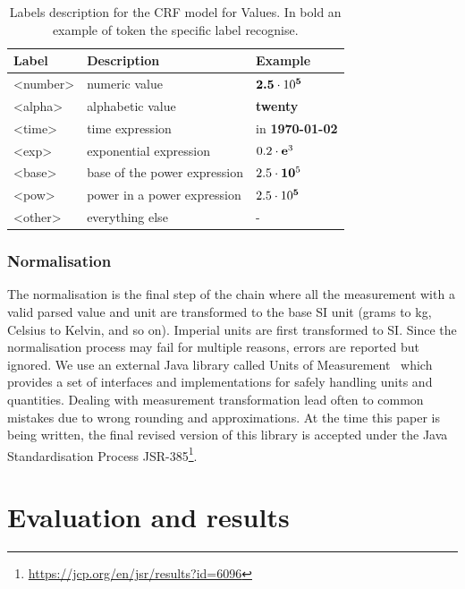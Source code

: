 \documentclass[sigconf]{acmart}
\begin{document}
\begin{table}[ht]
  \caption{Labels description for the CRF model for Values. In bold an example of token the specific label recognise.}
  \label{tab:values-model-labels}
  \begin{tabular}{lll}
    \toprule
    Label & Description & Example\\
    \midrule
    <number> & numeric value & $\textbf{2.5}\cdot10\textsuperscript{\textbf{5}}$ \\
    <alpha> & alphabetic value & \textbf{twenty} \\
    <time> & time expression  & in \textbf{1970-01-02}\\
    <exp> & exponential expression & $0.2\cdot\textbf{e}\textsuperscript{3}$ \\
    <base> & base of the power expression & $2.5\cdot\textbf{10}\textsuperscript{5}$\\
    <pow> & power in a power expression & $2.5\cdot10\textsuperscript{\textbf{5}}$ \\
    <other> & everything else & - \\
  \bottomrule
\end{tabular}
\end{table}

\subsubsection{Normalisation}

The normalisation is the final step of the chain where all the measurement with a valid parsed value and unit are transformed to the base SI unit (grams to kg, Celsius to Kelvin, and so on). Imperial units are first transformed to SI. Since the normalisation process may fail for multiple reasons, errors are reported but ignored. We use an external Java library called Units of Measurement~\cite{units_of_measurement} which provides a set of interfaces and implementations for safely handling units and quantities. Dealing with measurement transformation lead often to common mistakes due to wrong rounding and approximations. At the time this paper is being written, the final revised version of this library is accepted under the Java Standardisation Process JSR-385\footnote{\url{https://jcp.org/en/jsr/results?id=6096}}. 

\section{Evaluation and results}
\label{sec:results}
\end{document}
